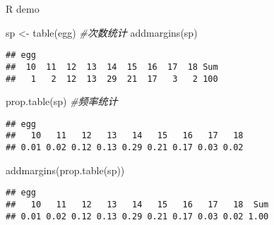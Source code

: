 \documentclass[
  10pt,
  ignorenonframetext,
]{beamer}
\newenvironment{Shaded}{\begin{snugshade}}{\end{snugshade}}
\newcommand{\CommentTok}[1]{\textcolor[rgb]{0.56,0.35,0.01}{\textit{#1}}}
\newcommand{\FunctionTok}[1]{\textcolor[rgb]{0.00,0.00,0.00}{#1}}
\newcommand{\NormalTok}[1]{#1}
\newcommand{\OtherTok}[1]{\textcolor[rgb]{0.56,0.35,0.01}{#1}}
\begin{document}
\begin{frame}[fragile]{R demo}
\protect\hypertarget{r-demo}{}
\begin{Shaded}
\begin{Highlighting}[]
\NormalTok{sp }\OtherTok{\textless{}{-}} \FunctionTok{table}\NormalTok{(egg) }\CommentTok{\#次数统计}
\FunctionTok{addmargins}\NormalTok{(sp)}
\end{Highlighting}
\end{Shaded}

\begin{verbatim}
## egg
##  10  11  12  13  14  15  16  17  18 Sum 
##   1   2  12  13  29  21  17   3   2 100
\end{verbatim}

\begin{Shaded}
\begin{Highlighting}[]
\FunctionTok{prop.table}\NormalTok{(sp) }\CommentTok{\#频率统计}
\end{Highlighting}
\end{Shaded}

\begin{verbatim}
## egg
##   10   11   12   13   14   15   16   17   18 
## 0.01 0.02 0.12 0.13 0.29 0.21 0.17 0.03 0.02
\end{verbatim}

\begin{Shaded}
\begin{Highlighting}[]
\FunctionTok{addmargins}\NormalTok{(}\FunctionTok{prop.table}\NormalTok{(sp))}
\end{Highlighting}
\end{Shaded}

\begin{verbatim}
## egg
##   10   11   12   13   14   15   16   17   18  Sum 
## 0.01 0.02 0.12 0.13 0.29 0.21 0.17 0.03 0.02 1.00
\end{verbatim}
\end{frame}
\end{document}
